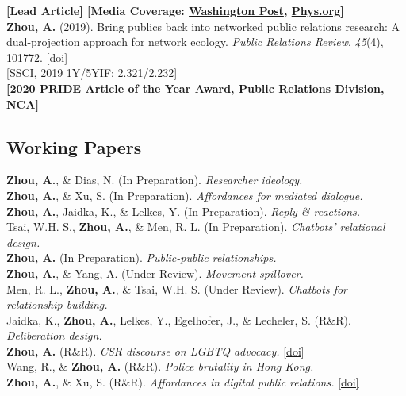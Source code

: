\documentclass[12pt, letterpaper]{article}
\newcommand{\doi}[1]{\href{#1}{{[doi]}}}
\newcommand{\years}[1]{\marginnote{\normalsize #1}}
\begin{document}
  \years{} {\textbf{[Lead Article] [Media Coverage: \href{https://www.washingtonpost.com/politics/2019/09/17/twitter-got-somewhat-more-civil-when-tweets-doubled-length-heres-how-we-know}{Washington Post}, \href{https://phys.org/news/2019-09-character-limit-twitter-civil.html}{Phys.org}]}\\
  \years{[1]} \textbf{Zhou, A.} (2019). Bring publics back into networked public relations research: A dual-projection approach for network ecology. \textit{Public Relations Review}, \textit{45}(4), 101772. \doi{https://doi.org/10.1016/j.pubrev.2019.03.004}\\
  \years{} {[SSCI, 2019 1Y/5YIF: 2.321/2.232]}\\
  \years{} {\textbf{[2020 PRIDE Article of the Year Award, Public Relations Division, NCA]}}

\subsection*{Working Papers}

\years{[11]} \textbf{Zhou, A.}, \& Dias, N. (In Preparation). \textit{Researcher ideology.}\\
\years{[10]} \textbf{Zhou, A.}, \& Xu, S. (In Preparation). \textit{Affordances for mediated dialogue.}\\
\years{[9]} \textbf{Zhou, A.}, Jaidka, K., \& Lelkes, Y. (In Preparation). \textit{Reply \& reactions.}\\
\years{[8]} Tsai, W.H. S., \textbf{Zhou, A.}, \&  Men, R. L. (In Preparation). \textit{Chatbots' relational design.}\\
\years{[7]} \textbf{Zhou, A.} (In Preparation). \textit{Public-public relationships.}\\
\years{[6]} \textbf{Zhou, A.}, \& Yang, A. (Under Review). \textit{Movement spillover.}\\
\years{[5]} Men, R. L., \textbf{Zhou, A.}, \& Tsai, W.H. S. (Under Review). \textit{Chatbots for relationship building.}\\
\years{[4]} Jaidka, K., \textbf{Zhou, A.}, Lelkes, Y., Egelhofer, J., \& Lecheler, S. (R\&R). \textit{Deliberation design.}\\
\years{[3]} \textbf{Zhou, A.} (R\&R). \textit{CSR discourse on LGBTQ advocacy.} \doi{https://doi.org/10.31219/osf.io/gz7bw}\\
\years{[2]} Wang, R., \& \textbf{Zhou, A.} (R\&R). \textit{Police brutality in Hong Kong.}\\
\years{[1]} \textbf{Zhou, A.}, \& Xu, S. (R\&R). \textit{Affordances in digital public relations.} \doi{https://doi.org/10.31235/osf.io/uzhk9}

}
\end{document}
